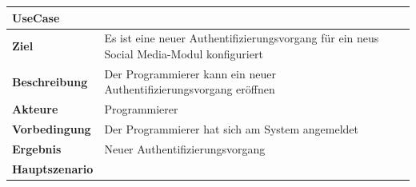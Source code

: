\begin{longtable}[c]{@{}ll@{}}
\toprule
\begin{minipage}[b]{0.34\columnwidth}\raggedright\strut
\textbf{UseCase}
\strut\end{minipage} &
\begin{minipage}[b]{0.60\columnwidth}\raggedright\strut
\strut\end{minipage}\tabularnewline
\midrule
\endhead
\begin{minipage}[t]{0.34\columnwidth}\raggedright\strut
\textbf{Ziel}
\strut\end{minipage} &
\begin{minipage}[t]{0.60\columnwidth}\raggedright\strut
Es ist eine neuer Authentifizierungsvorgang für ein neus Social
Media-Modul konfiguriert
\strut\end{minipage}\tabularnewline
\begin{minipage}[t]{0.34\columnwidth}\raggedright\strut
\textbf{Beschreibung}
\strut\end{minipage} &
\begin{minipage}[t]{0.60\columnwidth}\raggedright\strut
Der Programmierer kann ein neuer Authentifizierungsvorgang eröffnen
\strut\end{minipage}\tabularnewline
\begin{minipage}[t]{0.34\columnwidth}\raggedright\strut
\textbf{Akteure}
\strut\end{minipage} &
\begin{minipage}[t]{0.60\columnwidth}\raggedright\strut
Programmierer
\strut\end{minipage}\tabularnewline
\begin{minipage}[t]{0.34\columnwidth}\raggedright\strut
\textbf{Vorbedingung}
\strut\end{minipage} &
\begin{minipage}[t]{0.60\columnwidth}\raggedright\strut
Der Programmierer hat sich am System angemeldet
\strut\end{minipage}\tabularnewline
\begin{minipage}[t]{0.34\columnwidth}\raggedright\strut
\textbf{Ergebnis}
\strut\end{minipage} &
\begin{minipage}[t]{0.60\columnwidth}\raggedright\strut
Neuer Authentifizierungsvorgang
\strut\end{minipage}\tabularnewline
\begin{minipage}[t]{0.34\columnwidth}\raggedright\strut
\textbf{Hauptszenario}
\strut\end{minipage} &

\end{longtable}
